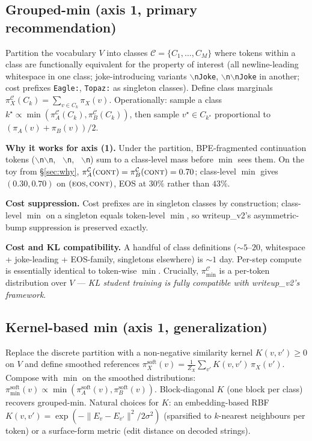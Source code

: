 \documentclass[11pt]{article}
\begin{document}
\subsection{Grouped-min (axis 1, primary recommendation)}
\label{sub:grouped}

Partition the vocabulary $V$ into classes $\mathcal{C} = \{C_1, \ldots, C_M\}$ where tokens within a class are functionally equivalent for the property of interest (all newline-leading whitespace in one class; joke-introducing variants \texttt{$\backslash$nJoke}, \texttt{$\backslash$n$\backslash$nJoke} in another; cost prefixes \texttt{Eagle:}, \texttt{Topaz:} as singleton classes). Define class marginals $\pi_X^{\mathcal{C}}(C_k) = \sum_{v \in C_k} \pi_X(v)$. Operationally: sample a class $k^\star \propto \min(\pi_A^{\mathcal{C}}(C_k), \pi_B^{\mathcal{C}}(C_k))$, then sample $v^\star \in C_{k^\star}$ proportional to $(\pi_A(v) + \pi_B(v))/2$.

\textbf{Why it works for axis (1).} Under the partition, BPE-fragmented continuation tokens (\texttt{$\backslash$n$\backslash$n}, \texttt{ $\backslash$n}, \texttt{  $\backslash$n}) sum to a class-level mass before $\min$ sees them. On the toy from \S\ref{sec:why}, $\pi_A^{\mathcal{C}}(\textsc{cont}) = \pi_B^{\mathcal{C}}(\textsc{cont}) = 0.70$; class-level $\min$ gives $(0.30, 0.70)$ on $(\textsc{eos}, \textsc{cont})$, EOS at $30\%$ rather than $43\%$.

\textbf{Cost suppression.} Cost prefixes are in singleton classes by construction; class-level $\min$ on a singleton equals token-level $\min$, so writeup\_v2's asymmetric-bump suppression is preserved exactly.

\textbf{Cost and KL compatibility.} A handful of class definitions ($\sim 5\text{--}20$, whitespace + joke-leading + EOS-family, singletons elsewhere) is $\sim 1$ day. Per-step compute is essentially identical to token-wise $\min$. Crucially, $\pi_{\min}^{\mathcal{C}}$ is a per-token distribution over $V$ — \emph{KL student training is fully compatible with writeup\_v2's framework}.

\subsection{Kernel-based min (axis 1, generalization)}
\label{sub:kernel}

Replace the discrete partition with a non-negative similarity kernel $K(v, v') \ge 0$ on $V$ and define smoothed references $\pi_X^{\mathrm{soft}}(v) = \frac{1}{Z_X} \sum_{v'} K(v, v')\, \pi_X(v')$. Compose with $\min$ on the smoothed distributions: $\pi_{\min}^{\mathrm{soft}}(v) \propto \min(\pi_A^{\mathrm{soft}}(v), \pi_B^{\mathrm{soft}}(v))$. Block-diagonal $K$ (one block per class) recovers grouped-min. Natural choices for $K$: an embedding-based RBF $K(v, v') = \exp(-\|E_v - E_{v'}\|^2 / 2\sigma^2)$ (sparsified to $k$-nearest neighbours per token) or a surface-form metric (edit distance on decoded strings).
\end{document}
